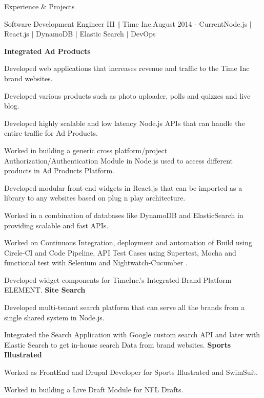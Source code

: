 \documentclass{resume} %
\begin{document}
\begin{rSection}{Experience \& Projects}

\begin{rSubsection}{Software Development Engineer III $\Vert$ Time Inc.}{August 2014 - Current}{Node.js $\vert$ React.js $\vert$ DynamoDB $\vert$ Elastic Search $\vert$ DevOps }{}
{\small
{\bf Integrated Ad Products }

\item Developed web applications that increases revenue and traffic to the Time Inc brand websites.
\item Developed various products such as photo uploader, polls and quizzes and live blog.
\item Developed highly scalable and low latency Node.js APIs that can handle the entire traffic for Ad Products.
\item Worked in building a generic cross platform/project Authorization/Authentication Module in Node.js used to access different products in Ad Products Platform.
\item Developed modular front-end widgets in React.js that can be imported as a library to any websites based on plug n play architecture.
\item Worked in a combination of databases like DynamoDB and ElasticSearch in providing scalable and fast APIs.
\item Worked on Continuous Integration, deployment and automation of Build using Circle-CI and Code Pipeline, API Test Cases using Supertest, Mocha and functional test with Selenium and Nightwatch-Cucumber .
\item Developed widget components for TimeInc.'s Integrated Brand Platform ELEMENT.
{\newline}
{\newline}
{\bf Site Search}
\item Developed multi-tenant search platform that can serve all the brands from a single shared system in Node.js.
\item Integrated the Search Application with Google custom search API and later with Elastic Search to get in-house search Data from brand websites.
{\newline}
{\newline}
{\bf Sports Illustrated}
\item Worked as FrontEnd and Drupal Developer for Sports Illustrated and SwimSuit.
\item Worked in building a Live Draft Module for NFL Drafts.
}
\end{rSubsection} 



\end{rSection}
\end{document}
